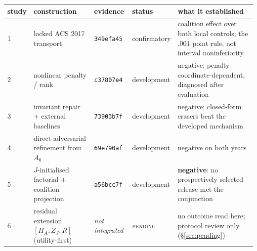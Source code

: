\begin{tabular}{@{}l p{3.5cm} l l p{5.9cm}@{}}
\toprule
study & construction & evidence & status & what it established \\
\midrule
1 & locked ACS 2017 transport & \texttt{349efa45} & confirmatory & coalition effect over both local controls; the $.001$ point rule, not interval noninferiority \\
2 & nonlinear penalty / rank & \texttt{c37807e4} & development & negative; penalty coordinate-dependent, diagnosed after evaluation \\
3 & invariant repair $+$ external baselines & \texttt{73903b7f} & development & negative; closed-form erasers beat the developed mechanism \\
4 & direct adversarial refinement from $A_0$ & \texttt{69e790af} & development & negative on both years \\
5 & $J$-initialised factorial $+$ coalition projection & \texttt{a56bcc7f} & development & \textbf{negative}: no prospectively selected release met the conjunction \\
6 & residual extension $[H_A,Z_J,R]$ (utility-first) & \emph{not integrated} & \textsc{pending} & no outcome read here; protocol review only (\S\ref{sec:pending}) \\
\bottomrule
\end{tabular}
